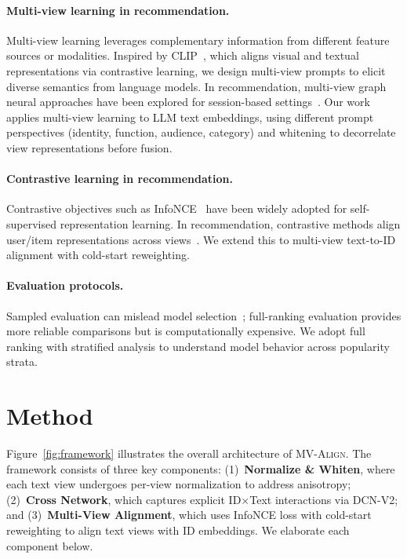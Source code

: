 \documentclass[sigconf,natbib=true,anonymous]{acmart}
\newcommand{\model}{\textsc{MV-Align}\xspace}
\newcommand{\llm}{\textsc{LLM}\xspace}
\newcommand{\InfoNCE}{InfoNCE\xspace}
\begin{document}
\paragraph{Multi-view learning in recommendation.}
Multi-view learning leverages complementary information from
different feature sources or modalities. Inspired by
CLIP~\cite{radford2021clip}, which aligns visual and textual
representations via contrastive learning, we design multi-view
prompts to elicit diverse semantics from language models. In
recommendation, multi-view graph neural approaches have been explored for
session-based settings~\cite{huang2025mvcgnn_session}. Our work applies
multi-view learning to \llm text embeddings, using different
prompt perspectives (identity, function, audience, category)
and whitening to decorrelate view representations before
fusion.

\paragraph{Contrastive learning in recommendation.}
Contrastive objectives such as \InfoNCE~\cite{oord2018cpc}
have been widely adopted for self-supervised representation
learning. In recommendation, contrastive methods align
user/item representations across views~\cite{wu2021cl4rec}.
We extend this to multi-view text-to-ID alignment with
cold-start reweighting.

\paragraph{Evaluation protocols.}
Sampled evaluation can mislead model
selection~\cite{krichene2020sampledmetrics}; full-ranking
evaluation provides more reliable comparisons but is
computationally expensive. We adopt full ranking with
stratified analysis to understand model behavior across
popularity strata.


\section{Method}
Figure~\ref{fig:framework} illustrates the overall architecture of \model.
The framework consists of three key components:
(1)~\textbf{Normalize \& Whiten}, where each text view undergoes per-view normalization to address anisotropy;
(2)~\textbf{Cross Network}, which captures explicit ID$\times$Text interactions via DCN-V2;
and (3)~\textbf{Multi-View Alignment}, which uses InfoNCE loss with cold-start reweighting to align text views with ID embeddings.
We elaborate each component below.
\end{document}
